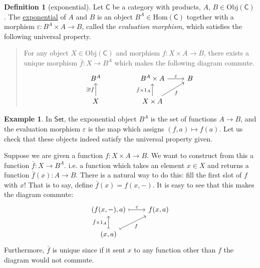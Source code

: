 \documentclass[a4paper]{report}
\newcommand{\defn}[1]{\ul{#1}}
\newcommand{\Obj}{\mathrm{Obj}}
\newcommand{\Hom}{\mathrm{Hom}}
\theoremstyle{definition}
\newtheorem{definition}{Definition}[section]
\newtheorem{example}{Example}[section]
\theoremstyle{plain}
\theoremstyle{remark}
\begin{document}
\begin{definition}[exponential]
  \label{def:exponential}
  Let $\mathsf{C}$ be a category with products, $A$, $B \in \Obj(\mathsf{C})$. The \defn{exponential} of $A$ and $B$ is an object $B^{A} \in \Hom(\mathsf{C})$ together with a morphism $\varepsilon\colon B^{A} \times A \to B$, called the \emph{evaluation morphism}, which satisfies the following universal property.

  \begin{quote}
    For any object $X \in \Obj(\mathsf{C})$ and morphism $f\colon X \times A \to B$, there exists a unique morphism $\bar{f}\colon X \to B^{A}$ which makes the following diagram commute.
    \begin{equation*}
      \begin{tikzcd}
        B^{A}
        & & B^{A} \times A
        \arrow[r, "\varepsilon"]
        & B
        \\
        X 
        \arrow[u, "\exists!\bar{f}"]
        & & X \times A
        \arrow[ur, swap, "f"]
        \arrow[u, "\bar{f} \times 1_{A}"]
      \end{tikzcd}
    \end{equation*}
  \end{quote}
\end{definition}

\begin{example}
  In $\mathsf{Set}$, the exponential object $B^{A}$ is the set of functions $A \to B$, and the evaluation morphism $\varepsilon$ is the map which assigns $(f, a) \mapsto f(a)$. Let us check that these objects indeed satisfy the universal property given.

  Suppose we are given a function $f\colon X \times A \to B$. We want to construct from this a function $\bar{f}\colon X \to B^{A}$. i.e. a function which takes an element $x \in X$ and returns a function $\bar{f}(x)\colon A \to B$. There is a natural way to do this: fill the first slot of $f$ with $x$! That is to say, define $\bar{f}(x) = f(x, -)$. It is easy to see that this makes the diagram commute:
  \begin{equation*}
    \begin{tikzcd}
      {(f(x,-), a)}
      \arrow[r, mapsto, "\varepsilon"]
      &{f(x, a)}
      \\
      {(x, a)}
      \arrow[u, mapsto, "\bar{f} \times 1_{A}"]
      \arrow[ur, mapsto, swap, "f"]
    \end{tikzcd}
  \end{equation*}
  Furthermore, $\bar{f}$ is unique since if it sent $x$ to any function other than $f$ the diagram would not commute.
\end{example}
\end{document}
